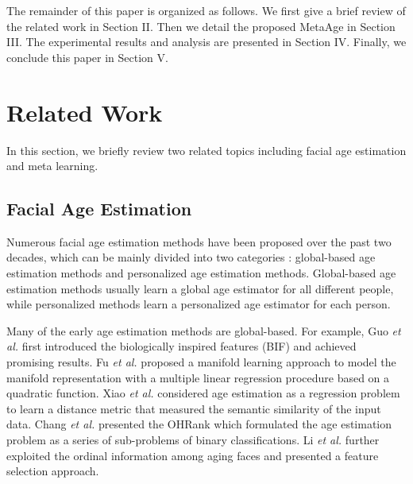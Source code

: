 \documentclass[journal,twoside]{IEEEtran}
\begin{document}
The remainder of this paper is organized as follows. We first give a brief review of the related work in Section II. Then we detail the proposed MetaAge in Section III. The experimental results and analysis are presented in Section IV. Finally, we conclude this paper in Section V.

\section{Related Work}
In this section, we briefly review two related topics including facial age estimation and meta learning.

\subsection{Facial Age Estimation}
Numerous facial age estimation methods \cite{lanitis2002toward,guo2010human,liu2019structure,he2017data} have been proposed over the past two decades, which can be mainly divided into two categories \cite{zhang2010multi}: global-based age estimation methods and personalized age estimation methods. Global-based age estimation methods usually learn a global age estimator for all different people, while personalized methods learn a personalized age estimator for each person.

Many of the early age estimation methods are global-based. For example, Guo \emph{et al.} \cite{guo2009human} first introduced the biologically inspired features (BIF) and achieved promising results.
Fu \emph{et al.} \cite{fu2008human} proposed a manifold learning approach to model the manifold representation with a multiple linear regression procedure based on a quadratic function. Xiao \emph{et al.} \cite{xiao2009learning} considered age estimation as a regression problem to learn a distance metric that measured the semantic similarity of the input data. Chang \emph{et al.} \cite{chang2011ordinal} presented the OHRank which formulated the age estimation problem as a series of sub-problems of binary classifications. Li \emph{et al.} \cite{li2012learning} further exploited the ordinal information among aging faces and presented a feature selection approach.
\end{document}
